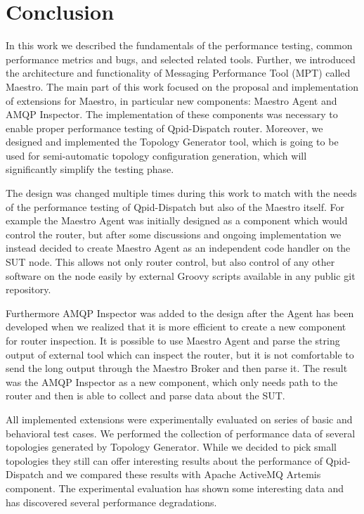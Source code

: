 
\chapter{Conclusion}
\label{Conclusion}
In this work we described the fundamentals of the performance testing, common performance metrics and bugs, and selected related tools. Further, we introduced the architecture and functionality of Messaging Performance Tool (MPT) called Maestro. The main part of this work focused on the proposal and implementation of extensions for Maestro, in particular new components: Maestro Agent and AMQP Inspector. The implementation of these components was necessary to enable proper performance testing of Qpid-Dispatch router. Moreover, we designed and implemented the Topology Generator tool, which is going to be used for semi-automatic topology configuration generation, which will significantly simplify the testing phase.

The design was changed multiple times during this work to match with the needs of the performance testing of Qpid-Dispatch but also of the Maestro itself. For example the Maestro Agent was initially designed as a component which would control the router, but after some discussions and ongoing implementation we instead decided to create Maestro Agent as an independent code handler on the SUT node. This allows not only router control, but also control of any other software on the node easily by external Groovy scripts available in any public git repository.

Furthermore AMQP Inspector was added to the design after the Agent has been developed when we realized that it is more efficient to create a new component for router inspection. It is possible to use Maestro Agent and parse the string output of external tool which can inspect the router, but it is not comfortable to send the long output through the Maestro Broker and then parse it. The result was the AMQP Inspector as a new component, which only needs path to the router and then is able to collect and parse data about the SUT.

All implemented extensions were experimentally evaluated on series of basic and behavioral test cases. We performed the collection of performance data of several topologies generated by Topology Generator. While we decided to pick small topologies they still can offer interesting results about the performance of Qpid-Dispatch and we compared these results with Apache ActiveMQ Artemis component. The experimental evaluation has shown some interesting data and has discovered several performance degradations.

